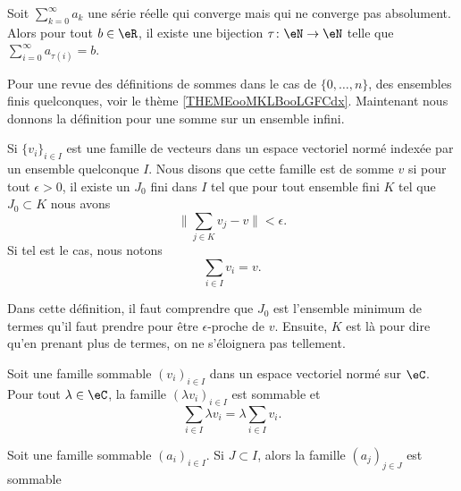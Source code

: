 \begin{proposition}     \label{PropyFJXpr}
	Soit \( \sum_{k=0}^{\infty}a_k\) une série réelle qui converge mais qui ne converge pas absolument. Alors pour tout \( b\in \eR\), il existe une bijection \( \tau\colon \eN\to \eN\) telle que \( \sum_{i=0}^{\infty}a_{\tau(i)}=b\).
\end{proposition}


Pour une revue des définitions de sommes dans le cas de \( \{ 0,\ldots, n \}\), des ensembles finis quelconques, voir le thème \ref{THEMEooMKLBooLGFCdx}. Maintenant nous donnons la définition pour une somme sur un ensemble infini.
\begin{definition}  \label{DefIkoheE}
	Si \( \{ v_i \}_{i\in I}\) est une famille de vecteurs dans un espace vectoriel normé indexée par un ensemble quelconque \( I\). Nous disons que cette famille est  de somme \( v\) si pour tout \( \epsilon>0\), il existe un \( J_0\) fini dans \( I\) tel que pour tout ensemble fini \( K\) tel que \( J_0\subset K\) nous avons
	\begin{equation}
		\| \sum_{j\in K}v_j-v \|<\epsilon.
	\end{equation}
    Si tel est le cas, nous notons
    \begin{equation}
        \sum_{i\in I}v_i=v.
    \end{equation}
\end{definition}
Dans cette définition, il faut comprendre que \( J_0\) est l'ensemble minimum de termes qu'il faut prendre pour être \( \epsilon\)-proche de \( v\). Ensuite, \( K\) est là pour dire qu'en prenant plus de termes, on ne s'éloignera pas tellement.


\begin{lemma}   \label{LEMooHFNXooFHfwzf}
    Soit une famille sommable \( (v_i)_{i\in I}\) dans un espace vectoriel normé sur \( \eC\). Pour tout \( \lambda\in \eC\), la famille \( (\lambda v_i)_{i\in I}\) est sommable et
    \begin{equation}
        \sum_{i\in I}\lambda v_i=\lambda\sum_{i\in I}v_i.
    \end{equation}
\end{lemma}

\begin{lemma}   \label{LEMooSBYEooNXzqJU}
    Soit une famille sommable \( (a_i)_{i\in I}\). Si \( J\subset I\), alors la famille \( (a_j)_{j\in J}\) est sommable
\end{lemma}

